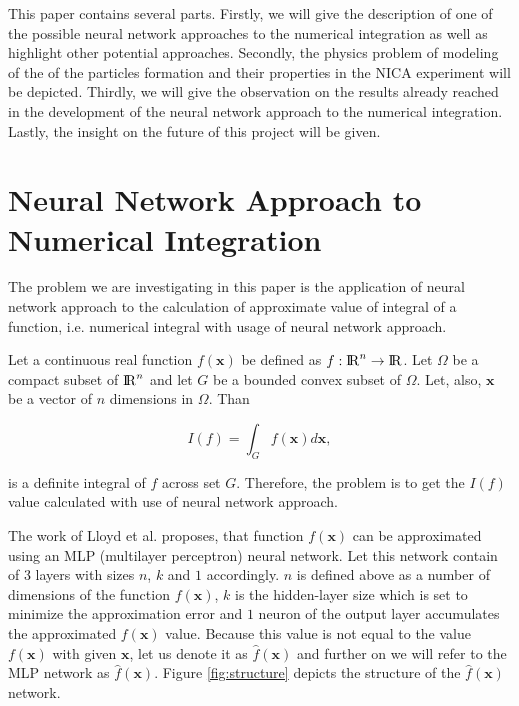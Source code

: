 \documentclass[%
]{ittmm}
\begin{document}
This paper contains several parts. Firstly, we will give the description of one of the possible neural network approaches to the numerical integration as well as highlight other potential approaches. Secondly, the physics problem of modeling of the of the particles formation and their properties in the NICA experiment will be depicted. Thirdly, we will give the observation on the results already reached in the development of the neural network approach to the numerical integration. Lastly, the insight on the future of this project will be given. 

\section{Neural Network Approach to Numerical Integration}

The problem we are investigating in this paper is the application of neural network approach to the calculation of approximate value of integral of a function, i.e. numerical integral with usage of neural network approach.

Let a continuous real function $f(\mathbf{x})$ be defined as $f: {\rm I\!R}^n \to {\rm I\!R}$. Let $\Omega$ be a compact subset of ${\rm I\!R}^n$ and let $G$ be a bounded convex subset of $\Omega$. Let, also, $\mathbf{x}$ be a vector of $n$ dimensions in $\Omega$. Than

\begin{equation}
    \label{eq: integral definition}
    I(f) = \int_G f(\mathbf{x})d\mathbf{x},
\end{equation}

\noindent is a definite integral of $f$ across set $G$. Therefore, the problem is to get the $I(f)$ value calculated with use of neural network approach.

The work of Lloyd et al.\cite{lloyd2020using} proposes, that function $f(\mathbf{x})$ can be approximated using an MLP (multilayer perceptron) neural network. Let this network contain of 3 layers with sizes $n$, $k$ and $1$ accordingly. $n$ is defined above as a number of dimensions of the function $f(\mathbf{x})$, $k$ is the hidden-layer size which is set to minimize the approximation error and $1$ neuron of the output layer accumulates the approximated $f(\mathbf{x})$ value. Because this value is not equal to the value $f(\mathbf{x})$ with given $\mathbf{x}$, let us denote it as $\hat{f}(\mathbf{x})$ and further on we will refer to the MLP network as $\hat{f}(\mathbf{x})$. Figure \ref{fig:structure} depicts the structure of the $\hat{f}(\mathbf{x})$ network. 
\end{document}
